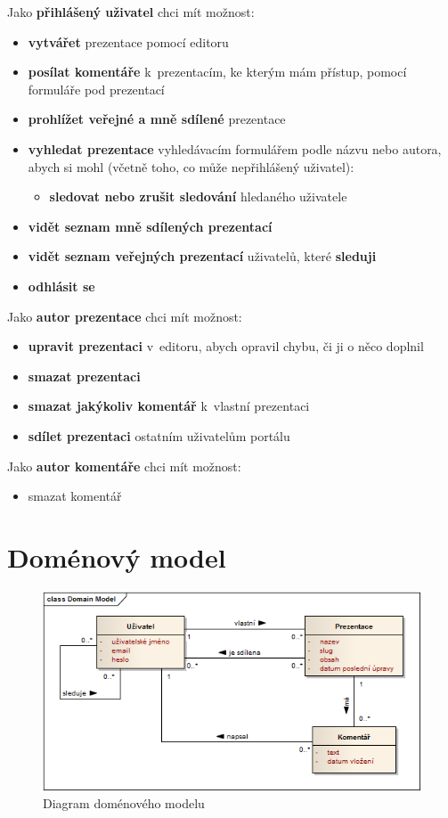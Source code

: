 \documentclass[11pt,twoside,a4paper]{book}
\begin{document}
\noindent Jako \textbf{přihlášený uživatel} chci mít možnost:
\begin{itemize}
	\item \textbf{vytvářet} prezentace pomocí editoru
	\item \textbf{posílat komentáře} k~prezentacím, ke kterým mám přístup, pomocí formuláře pod prezentací
	\item \textbf{prohlížet veřejné a mně sdílené} prezentace
	\item \textbf{vyhledat prezentace} vyhledávacím formulářem podle názvu nebo autora, abych si mohl (včetně toho, co může nepřihlášený uživatel):
		\begin{itemize}
		\item \textbf{sledovat nebo zrušit sledování} hledaného uživatele
		\end{itemize}
	\item \textbf{vidět seznam mně sdílených prezentací}
	\item \textbf{vidět seznam veřejných prezentací} uživatelů, které \textbf{sleduji}
	\item \textbf{odhlásit se} 
\end{itemize}


\noindent Jako \textbf{autor prezentace} chci mít možnost:
\begin{itemize}
	\item \textbf{upravit prezentaci }v~editoru, abych opravil chybu, či ji o něco doplnil
	\item \textbf{smazat prezentaci}
	\item \textbf{smazat jakýkoliv komentář} k~vlastní prezentaci
	\item \textbf{sdílet prezentaci} ostatním uživatelům portálu
\end{itemize}


\noindent Jako \textbf{autor komentáře} chci mít možnost:
\begin{itemize}
	\item smazat komentář
\end{itemize}


\chapter{Doménový model}
\begin{figure}[ht]
	\begin{center}
		\includegraphics[width=14cm]{PRO-img/PRO-img001.png}
		\caption{Diagram doménového modelu}
		\label{fig:domainModel}
	\end{center}
\end{figure}
\end{document}
